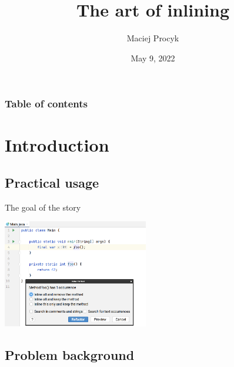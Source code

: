 \documentclass[hyperref={pdfpagelabels=false},xcolor={dvipsnames},compress,table,usenames,dvipsnames]{beamer}
\title{The art of inlining}
\author{Maciej Procyk}
\date{May 9, 2022}
\begin{document}
    \logo{}

    {
        \begin{frame}
            \maketitle
        \end{frame}
    }


    \begin{frame}
        \frametitle{Table of contents}
        \tableofcontents
    \end{frame}


    \section{Introduction}

    \subsection{Practical usage}

    \begin{frame}[fragile]{The goal of the story}
        \begin{center}
            \includegraphics[width=180pt]{images/goal.png}
        \end{center}
    \end{frame}

    \subsection{Problem background}
\end{document}
